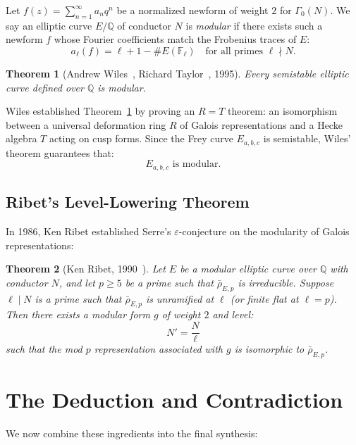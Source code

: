 \documentclass[11pt,a4paper]{article}
\theoremstyle{plain}
\newtheorem{theorem}{Theorem}[section]
\theoremstyle{definition}
\theoremstyle{remark}
\newcommand{\Q}{\mathbb{Q}}
\newcommand{\F}{\mathbb{F}}
\begin{document}
Let $f(z) = \sum_{n=1}^\infty a_n q^n$ be a normalized newform of weight $2$ for $\Gamma_0(N)$. We say an elliptic curve $E/\Q$ of conductor $N$ is \emph{modular} if there exists such a newform $f$ whose Fourier coefficients match the Frobenius traces of $E$:
\[
a_\ell(f) = \ell + 1 - \#E(\F_\ell) \quad \text{for all primes } \ell \nmid N.
\]

\begin{theorem}[Andrew Wiles~\cite{wiles1995}, Richard Taylor~\cite{taylorwiles1995}, 1995]
\label{thm:wiles}
Every semistable elliptic curve defined over $\Q$ is modular.
\end{theorem}

Wiles established Theorem~\ref{thm:wiles} by proving an $R = T$ theorem: an isomorphism between a universal deformation ring $R$ of Galois representations and a Hecke algebra $T$ acting on cusp forms. Since the Frey curve $E_{a,b,c}$ is semistable, Wiles' theorem guarantees that:
\begin{equation}
E_{a,b,c} \text{ is modular.}
\end{equation}

\subsection{Ribet's Level-Lowering Theorem}

In 1986, Ken Ribet established Serre's $\varepsilon$-conjecture on the modularity of Galois representations:

\begin{theorem}[Ken Ribet, 1990~\cite{ribet1990}]
\label{thm:ribet}
Let $E$ be a modular elliptic curve over $\Q$ with conductor $N$, and let $p \ge 5$ be a prime such that $\bar{\rho}_{E,p}$ is irreducible. Suppose $\ell \mid N$ is a prime such that $\bar{\rho}_{E,p}$ is unramified at $\ell$ (or finite flat at $\ell = p$). Then there exists a modular form $g$ of weight $2$ and level:
\begin{equation}
N' = \frac{N}{\ell}
\end{equation}
such that the mod $p$ representation associated with $g$ is isomorphic to $\bar{\rho}_{E,p}$.
\end{theorem}

\section{The Deduction and Contradiction}

We now combine these ingredients into the final synthesis:
\end{document}
